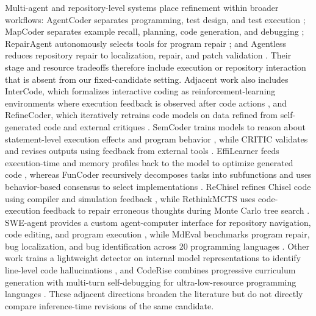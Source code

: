 Multi-agent and repository-level systems place refinement within broader workflows: AgentCoder separates programming, test design, and test execution \cite{huang2023agentcoder}; MapCoder separates example recall, planning, code generation, and debugging \cite{islam-etal-2024-mapcoder}; RepairAgent autonomously selects tools for program repair \cite{bouzenia2025repairagent}; and Agentless reduces repository repair to localization, repair, and patch validation \cite{xia2024agentless}.
Their stage and resource tradeoffs therefore include execution or repository interaction that is absent from our fixed-candidate setting.
Adjacent work also includes InterCode, which formalizes interactive coding as reinforcement-learning environments where execution feedback is observed after code actions \cite{yang2023intercode}, and RefineCoder, which iteratively retrains code models on data refined from self-generated code and external critiques \cite{zhou2025refinecoder}.
SemCoder trains models to reason about statement-level execution effects and program behavior \cite{ding2024semcoder}, while CRITIC validates and revises outputs using feedback from external tools \cite{gou2024critic}.
EffiLearner feeds execution-time and memory profiles back to the model to optimize generated code \cite{huang2024effilearner}, whereas FunCoder recursively decomposes tasks into subfunctions and uses behavior-based consensus to select implementations \cite{chen2024funcoder}.
ReChisel refines Chisel code using compiler and simulation feedback \cite{niu2025rechisel}, while RethinkMCTS uses code-execution feedback to repair erroneous thoughts during Monte Carlo tree search \cite{li-etal-2025-rethinkmcts}.
SWE-agent provides a custom agent-computer interface for repository navigation, code editing, and program execution \cite{yang2024sweagent}, while MdEval benchmarks program repair, bug localization, and bug identification across 20 programming languages \cite{liu-etal-2026-mdeval}.
Other work trains a lightweight detector on internal model representations to identify line-level code hallucinations \cite{andriushchenko-etal-2026-efficient}, and CodeRise combines progressive curriculum generation with multi-turn self-debugging for ultra-low-resource programming languages \cite{wen-etal-2026-coderise}.
These adjacent directions broaden the literature but do not directly compare inference-time revisions of the same candidate.

